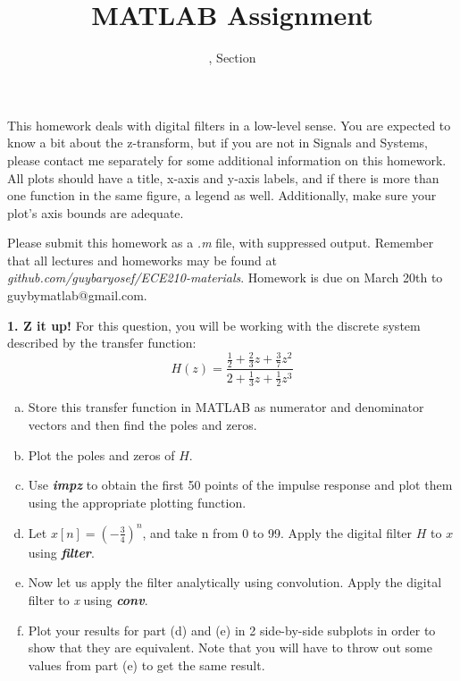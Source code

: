 \documentclass[11pt]{article}
\title{MATLAB Assignment \Homework}
\author{\Session, Section \Section}
\date{}
\makeatletter
\def\MyEmail{guybymatlab@gmail.com}
\def\DateOfSubmission{March 20th }
\makeatother
\begin{document}
\maketitle
This homework deals with digital filters in a low-level sense.
You are expected to know a bit about the z-transform,
but if you are not in Signals and Systems,
please contact me separately for some additional information on this homework.
All plots should have a title, x-axis and y-axis labels,
and if there is more than one function in the same figure, a legend as well.
Additionally, make sure your plot's axis bounds are adequate. 

Please submit this homework as a \textit{.m} file, 
with suppressed output.
Remember that all lectures and homeworks may be found at 
\textit{github.com/guybaryosef/ECE210-materials}.
Homework is due on \DateOfSubmission to \MyEmail.

\noindent
\newline
\textbf{1. Z it up!}
For this question,
you will be working with the discrete system described by the transfer function: 
$$H(z) = \frac{\frac{1}{2}+\frac{2}{3}z+\frac{3}{7}z^2}{2+\frac{1}{3}z+\frac{1}{2}z^3}$$
\begin{enumerate}[a.]
    \item Store this transfer function in MATLAB as numerator and denominator vectors and
    then find the poles and zeros.
    
    \item Plot the poles and zeros of $H$.

    \item Use \textit{\textbf{impz}} to obtain the first 50 points of the impulse response
    and plot them using the appropriate plotting function. 
    
    \item Let $x[n] = (-\frac{3}{4})^n$, and take n from 0 to 99.
    Apply the digital filter $H$ to $x$ using \textit{\textbf{filter}}. 
    
    \item Now let us apply the filter analytically using convolution.
    Apply the digital filter to \textit{x} using \textit{\textbf{conv}}.
    
    \item Plot your results for part (d) and (e) in 2 side-by-side subplots in order to
    show that they are equivalent. Note that you will have to throw out some values from
    part (e) to get the same result.


\end{enumerate}
\end{document}
